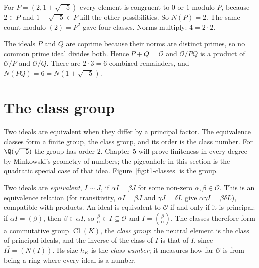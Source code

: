 \begin{examplex}
For $P=(2,1+\sqrt{-5})$ every element is congruent to $0$ or $1$ modulo $P$, because $2\in P$ and $1+\sqrt{-5}\in P$ kill the other possibilities. So $N(P)=2$. The same count modulo $(2)=P^2$ gave four classes. Norms multiply: $4=2\cdot 2$.
\end{examplex}

\begin{examplex}
The ideals $P$ and $Q$ are coprime because their norms are distinct primes, so no common prime ideal divides both. Hence $P+Q=\mathcal O$ and $\mathcal O/PQ$ is a product of $\mathcal O/P$ and $\mathcal O/Q$. There are $2\cdot 3=6$ combined remainders, and $N(PQ)=6=N(1+\sqrt{-5})$.
\end{examplex}

\section{The class group}

Two ideals are equivalent when they differ by a principal factor. The equivalence classes form a finite group, the class group, and its order is the class number. For $\Q(\sqrt{-5})$ the group has order $2$. Chapter~5 will prove finiteness in every degree by Minkowski's geometry of numbers; the pigeonhole in this section is the quadratic special case of that idea. Figure~\ref{fig:t1-classes} is the group.

Two ideals are \emph{equivalent}, $I\sim J$, if $\alpha I=\beta J$ for some non-zero $\alpha,\beta\in\mathcal O$. This is an equivalence relation (for transitivity, $\alpha I=\beta J$ and $\gamma J=\delta L$ give $\alpha\gamma I=\beta\delta L$), compatible with products. An ideal is equivalent to $\mathcal O$ if and only if it is principal: if $\alpha I=(\beta)$, then $\beta\in\alpha I$, so $\frac\beta\alpha\in I\subseteq\mathcal O$ and $I=\left(\frac\beta\alpha\right)$. The classes therefore form a commutative group $\operatorname{Cl}(K)$, the \emph{class group}: the neutral element is the class of principal ideals, and the inverse of the class of $I$ is that of $\bar I$, since $I\bar I=(N(I))$. Its size $h_K$ is the \emph{class number}; it measures how far $\mathcal O$ is from being a ring where every ideal is a number.

